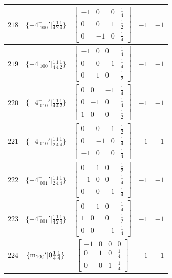 \documentclass[fleqn,8pt]{jsarticle}
\begin{document}
\begin{longtable}{ccccc}
$ 218 $ & $ \{-4^{+}_{\,\,100}{}'|\frac{1}{4} \frac{1}{2} \frac{1}{4}\} $ & $ \begin{bmatrix} -1 & 0 & 0 & \frac{1}{4} \\ 0 & 0 & 1 & \frac{1}{2} \\ 0 & -1 & 0 & \frac{1}{4} \end{bmatrix} $ & $ -1 $ & $ -1 $ \\ \hline
$ 219 $ & $ \{-4^{-}_{\,\,100}{}'|\frac{1}{4} \frac{1}{4} \frac{1}{2}\} $ & $ \begin{bmatrix} -1 & 0 & 0 & \frac{1}{4} \\ 0 & 0 & -1 & \frac{1}{4} \\ 0 & 1 & 0 & \frac{1}{2} \end{bmatrix} $ & $ -1 $ & $ -1 $ \\ \hline
$ 220 $ & $ \{-4^{+}_{\,\,010}{}'|\frac{1}{4} \frac{1}{4} \frac{1}{2}\} $ & $ \begin{bmatrix} 0 & 0 & -1 & \frac{1}{4} \\ 0 & -1 & 0 & \frac{1}{4} \\ 1 & 0 & 0 & \frac{1}{2} \end{bmatrix} $ & $ -1 $ & $ -1 $ \\ \hline
$ 221 $ & $ \{-4^{-}_{\,\,010}{}'|\frac{1}{2} \frac{1}{4} \frac{1}{4}\} $ & $ \begin{bmatrix} 0 & 0 & 1 & \frac{1}{2} \\ 0 & -1 & 0 & \frac{1}{4} \\ -1 & 0 & 0 & \frac{1}{4} \end{bmatrix} $ & $ -1 $ & $ -1 $ \\ \hline
$ 222 $ & $ \{-4^{+}_{\,\,001}{}'|\frac{1}{2} \frac{1}{4} \frac{1}{4}\} $ & $ \begin{bmatrix} 0 & 1 & 0 & \frac{1}{2} \\ -1 & 0 & 0 & \frac{1}{4} \\ 0 & 0 & -1 & \frac{1}{4} \end{bmatrix} $ & $ -1 $ & $ -1 $ \\ \hline
$ 223 $ & $ \{-4^{-}_{\,\,001}{}'|\frac{1}{4} \frac{1}{2} \frac{1}{4}\} $ & $ \begin{bmatrix} 0 & -1 & 0 & \frac{1}{4} \\ 1 & 0 & 0 & \frac{1}{2} \\ 0 & 0 & -1 & \frac{1}{4} \end{bmatrix} $ & $ -1 $ & $ -1 $ \\ \hline
$ 224 $ & $ \{{\rm m}_{100}{}'|0 \frac{1}{4} \frac{1}{4}\} $ & $ \begin{bmatrix} -1 & 0 & 0 & 0 \\ 0 & 1 & 0 & \frac{1}{4} \\ 0 & 0 & 1 & \frac{1}{4} \end{bmatrix} $ & $ -1 $ & $ -1 $ \\ \hline

\end{longtable}
\end{document}
